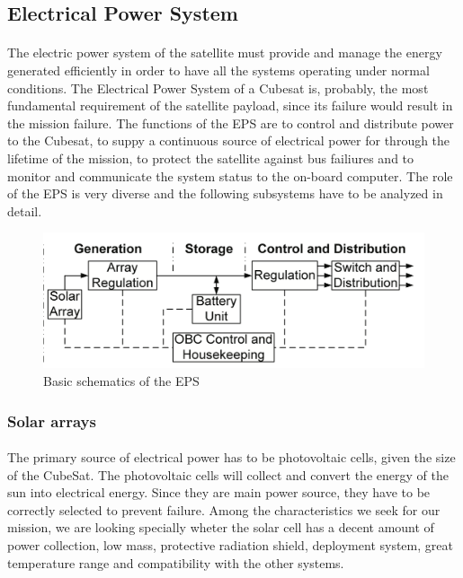 \subsection{Electrical Power System}

\paragraph{}The electric power system of the satellite must provide and manage the energy generated efficiently in order to have all the systems operating under normal conditions. The Electrical Power System of a Cubesat is, probably, the most fundamental requirement of the satellite payload, since its failure would result in the mission failure. The functions of the EPS are to control and distribute power to the Cubesat, to suppy a continuous source of electrical power for through the lifetime of the mission, to protect the satellite against bus failiures and to monitor and communicate the system status to the on-board computer. The role of the EPS is very diverse and the following subsystems have to be analyzed in detail.

\begin{figure}[h]
\includegraphics[scale=0.6]{./sections/SatelliteDesign/images/EPSschematics}
\centering
\caption{Basic schematics of the EPS \cite{epsbasics}}
\end{figure}

\subsubsection{Solar arrays}

\paragraph{}The primary source of electrical power has to be photovoltaic cells, given the size of the CubeSat. The photovoltaic cells will collect and convert the energy of the sun into electrical energy. Since they are main power source, they have to be correctly selected to prevent failure. Among the characteristics we seek for our mission, we are looking specially wheter the solar cell has a decent amount of power collection, low mass, protective radiation shield, deployment system, great temperature range and compatibility with the other systems.

